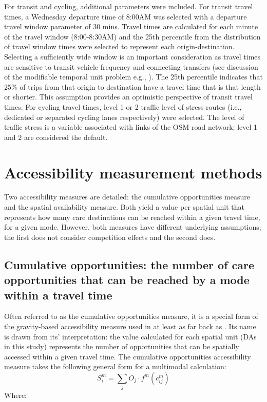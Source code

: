 \documentclass[
  authoryear,
  preprint,
  3p]{elsarticle}
\begin{document}
For transit and cycling, additional parameters were included. For
transit travel times, a Wednesday departure time of 8:00AM was selected
\citep{boisjolyDailyFluctuationsTransit2016} with a departure travel
window parameter of 30 mins. Travel times are calculated for each minute
of the travel window (8:00-8:30AM) and the 25th percentile from the
distribution of travel window times were selected to represent each
origin-destination. Selecting a sufficiently wide window is an important
consideration as travel times are sensitive to transit vehicle frequency
and connecting transfers (see discussion of the modifiable temporal unit
problem e.g., \citep{pereiraFutureAccessibilityImpacts2019}). The 25th
percentile indicates that 25\% of trips from that origin to destination
have a travel time that is that length or shorter. This assumption
provides an optimistic perspective of transit travel times. For cycling
travel times, level 1 or 2 traffic level of stress routes (i.e.,
dedicated or separated cycling lanes respectively) were selected. The
level of traffic stress is a variable associated with links of the OSM
road network; level 1 and 2 are considered the default.

\section{Accessibility measurement
methods}\label{accessibility-measurement-methods}

Two accessibility measures are detailed: the cumulative opportunities
measure and the spatial availability measure. Both yield a value per
spatial unit that represents how many care destinations can be reached
within a given travel time, for a given mode. However, both measures
have different underlying assumptions; the first does not consider
competition effects and the second does.

\subsection{Cumulative opportunities: the number of care opportunities
that can be reached by a mode within a travel
time}\label{cumulative-opportunities-the-number-of-care-opportunities-that-can-be-reached-by-a-mode-within-a-travel-time}

Often referred to as the cumulative opportunities measure, it is a
special form of the gravity-based accessibility measure used in at least
as far back as \citeauthor{hansenHowAccessibilityShapes1959}
\citetext{\citeyear{hansenHowAccessibilityShapes1959}; \citealp{handyMeasuringAccessibilityExploration1997}}.
Its name is drawn from its' interpretation: the value calculated for
each spatial unit (DAs in this study) represents the number of
opportunities that can be spatially accessed within a given travel time.
The cumulative opportunities accessibility measure takes the following
general form for a multimodal calculation: \[
S_i^m=\sum_{j}O_j\cdot f^m(c_{ij}^m)
\] \noindent Where:
\end{document}
